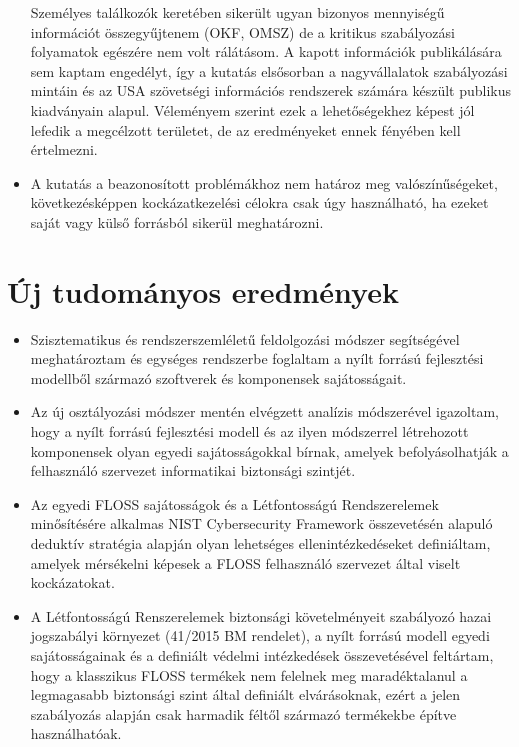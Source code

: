 \documentclass[12pt,magyar,a4paper,oneside]{scrreprt}
\begin{document}
\begin{itemize}
  Személyes találkozók keretében sikerült ugyan bizonyos mennyiségű
  információt összegyűjtenem (OKF, OMSZ) de a kritikus szabályozási
  folyamatok egészére nem volt rálátásom. A kapott információk
  publikálására sem kaptam engedélyt, így a kutatás elsősorban a
  nagyvállalatok szabályozási mintáin és az USA szövetségi információs
  rendszerek számára készült publikus kiadványain alapul. Véleményem
  szerint ezek a lehetőségekhez képest jól lefedik a megcélzott
  területet, de az eredményeket ennek fényében kell értelmezni.
\item
  A kutatás a beazonosított problémákhoz nem határoz meg
  valószínűségeket, következésképpen kockázatkezelési célokra csak úgy
  használható, ha ezeket saját vagy külső forrásból sikerül
  meghatározni.
\end{itemize}

\hypertarget{uxfaj-tudomuxe1nyos-eredmuxe9nyek}{%
\chapter{Új tudományos
eredmények}\label{uxfaj-tudomuxe1nyos-eredmuxe9nyek}}

\begin{itemize}
\item
  Szisztematikus és rendszerszemléletű feldolgozási módszer segítségével
  meghatároztam és egységes rendszerbe foglaltam a nyílt forrású
  fejlesztési modellből származó szoftverek és komponensek
  sajátosságait.
\item
  Az új osztályozási módszer mentén elvégzett analízis módszerével
  igazoltam, hogy a nyílt forrású fejlesztési modell és az ilyen
  módszerrel létrehozott komponensek olyan egyedi sajátosságokkal
  bírnak, amelyek befolyásolhatják a felhasználó szervezet informatikai
  biztonsági szintjét.
\item
  Az egyedi FLOSS sajátosságok és a Létfontosságú Rendszerelemek
  minősítésére alkalmas NIST Cybersecurity Framework összevetésén
  alapuló deduktív stratégia alapján olyan lehetséges
  ellenintézkedéseket definiáltam, amelyek mérsékelni képesek a FLOSS
  felhasználó szervezet által viselt kockázatokat.
\item
  A Létfontosságú Renszerelemek biztonsági követelményeit szabályozó
  hazai jogszabályi környezet (41/2015 BM rendelet), a nyílt forrású
  modell egyedi sajátosságainak és a definiált védelmi intézkedések
  összevetésével feltártam, hogy a klasszikus FLOSS termékek nem
  felelnek meg maradéktalanul a legmagasabb biztonsági szint által
  definiált elvárásoknak, ezért a jelen szabályozás alapján csak
  harmadik féltől származó termékekbe építve használhatóak.
\end{itemize}
\end{document}
